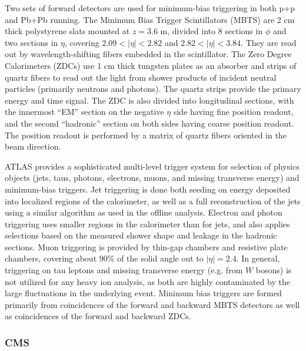 Two sets of forward detectors are used for minimum-bias triggering in both 
p+p and Pb+Pb running.  The Minimum Bias Trigger Scintillators (MBTS) are
2 cm thick polystyrene slats mounted at $z=3.6$ m, divided into 8 sections in
$\phi$ and two sections in $\eta$, covering $2.09<|\eta|<2.82$ and
$2.82<|\eta|<3.84$.  They are read out by wavelength-shifting fibers embedded
in the scintillator.  
The Zero Degree Calorimeters (ZDCs) use 1 cm thick tungsten plates as an absorber and strips
of quartz fibers to read out the light from shower products of incident neutral
particles (primarily neutrons and photons).
The quartz strips provide the primary energy and time signal.
The ZDC is also divided into longitudinal sections, with the innermost ``EM'' section 
on the negative $\eta$ side having fine position readout, and the second
``hadronic'' section on both sides having coarse position readout.
The position readout is performed by a matrix of quartz fibers oriented in the beam
direction.

ATLAS provides a sophisticated multi-level trigger system for
selection of physics objects (jets, taus, photons, electrons, muons,
and missing transverse energy) and minimum-bias triggers.
Jet triggering is done both seeding on energy deposited into localized
regions of the calorimeter, as well as a full reconstruction of the jets
using a similar algorithm as used in the offline analysis.
Electron and photon triggering uses smaller regions in the calorimeter
than for jets, and also applies selections based on the measured shower
shape and leakage in the hadronic sections.
Muon triggering is provided by thin-gap chambers and resistive plate chambers,
covering about 90\% of the solid angle out to $|\eta|=2.4$.
In general, triggering on tau leptons and missing transverse energy (e.g.
from $W$ bosons) is not utilized for any heavy ion analysis, as both
are highly contaminated by the large fluctuations in the
underlying event.
Minimum bias triggers are formed primarily from coincidences of the forward
and backward MBTS detectors as well as coincidences of the forward and backward
ZDCs.

\subsubsection{CMS}

